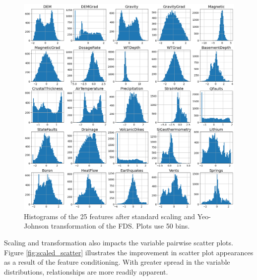 \begin{figure}[!htp]
\centering
\includegraphics[width=\textwidth]{templates/images/Figure-Scaled_Histograms.png}
\caption[Scaled FDS histograms]{Histograms of the 25 features after standard scaling and Yeo-Johnson transformation of the FDS. Plots use 50 bins.}
\label{fig:scaled_hist}
\end{figure}

Scaling and transformation also impacts the variable pairwise scatter plots. Figure \ref{fig:scaled_scatter} illustrates the improvement in scatter plot appearances as a result of the feature conditioning. With greater spread in the variable distributions, relationships are more readily apparent.


